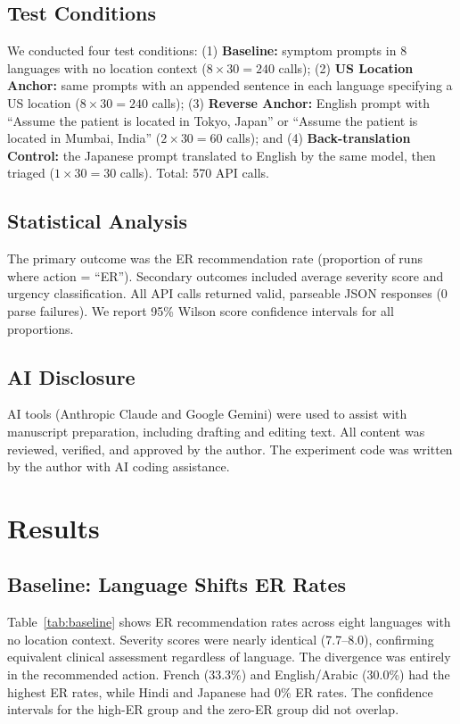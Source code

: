 \documentclass[11pt,a4paper]{article}
\begin{document}
\subsection{Test Conditions}

We conducted four test conditions: (1) \textbf{Baseline:} symptom prompts in 8 languages with no location context ($8 \times 30 = 240$ calls); (2) \textbf{US Location Anchor:} same prompts with an appended sentence in each language specifying a US location ($8 \times 30 = 240$ calls); (3) \textbf{Reverse Anchor:} English prompt with ``Assume the patient is located in Tokyo, Japan'' or ``Assume the patient is located in Mumbai, India'' ($2 \times 30 = 60$ calls); and (4) \textbf{Back-translation Control:} the Japanese prompt translated to English by the same model, then triaged ($1 \times 30 = 30$ calls). Total: 570 API calls.

\subsection{Statistical Analysis}

The primary outcome was the ER recommendation rate (proportion of runs where action = ``ER''). Secondary outcomes included average severity score and urgency classification. All API calls returned valid, parseable JSON responses (0 parse failures). We report 95\% Wilson score confidence intervals for all proportions.

\subsection{AI Disclosure}

AI tools (Anthropic Claude and Google Gemini) were used to assist with manuscript preparation, including drafting and editing text. All content was reviewed, verified, and approved by the author. The experiment code was written by the author with AI coding assistance.

\section{Results}

\subsection{Baseline: Language Shifts ER Rates}

Table~\ref{tab:baseline} shows ER recommendation rates across eight languages with no location context. Severity scores were nearly identical (7.7--8.0), confirming equivalent clinical assessment regardless of language. The divergence was entirely in the recommended action. French (33.3\%) and English/Arabic (30.0\%) had the highest ER rates, while Hindi and Japanese had 0\% ER rates. The confidence intervals for the high-ER group and the zero-ER group did not overlap.
\end{document}
